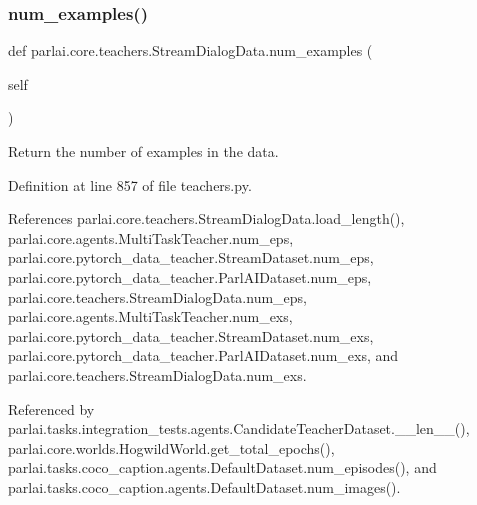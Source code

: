 \subsubsection{\texorpdfstring{num\+\_\+examples()}{num\_examples()}}
{\footnotesize\ttfamily def parlai.\+core.\+teachers.\+Stream\+Dialog\+Data.\+num\+\_\+examples (\begin{DoxyParamCaption}\item[{}]{self }\end{DoxyParamCaption})}

\begin{DoxyVerb}Return the number of examples in the data.\end{DoxyVerb}
 

Definition at line 857 of file teachers.\+py.



References parlai.\+core.\+teachers.\+Stream\+Dialog\+Data.\+load\+\_\+length(), parlai.\+core.\+agents.\+Multi\+Task\+Teacher.\+num\+\_\+eps, parlai.\+core.\+pytorch\+\_\+data\+\_\+teacher.\+Stream\+Dataset.\+num\+\_\+eps, parlai.\+core.\+pytorch\+\_\+data\+\_\+teacher.\+Parl\+A\+I\+Dataset.\+num\+\_\+eps, parlai.\+core.\+teachers.\+Stream\+Dialog\+Data.\+num\+\_\+eps, parlai.\+core.\+agents.\+Multi\+Task\+Teacher.\+num\+\_\+exs, parlai.\+core.\+pytorch\+\_\+data\+\_\+teacher.\+Stream\+Dataset.\+num\+\_\+exs, parlai.\+core.\+pytorch\+\_\+data\+\_\+teacher.\+Parl\+A\+I\+Dataset.\+num\+\_\+exs, and parlai.\+core.\+teachers.\+Stream\+Dialog\+Data.\+num\+\_\+exs.



Referenced by parlai.\+tasks.\+integration\+\_\+tests.\+agents.\+Candidate\+Teacher\+Dataset.\+\_\+\+\_\+len\+\_\+\+\_\+(), parlai.\+core.\+worlds.\+Hogwild\+World.\+get\+\_\+total\+\_\+epochs(), parlai.\+tasks.\+coco\+\_\+caption.\+agents.\+Default\+Dataset.\+num\+\_\+episodes(), and parlai.\+tasks.\+coco\+\_\+caption.\+agents.\+Default\+Dataset.\+num\+\_\+images().

